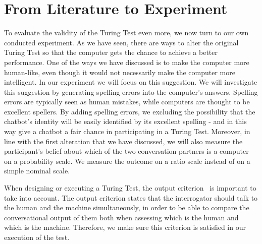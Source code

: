 \section{From Literature to Experiment}
To evaluate the validity of the Turing Test even more, we now turn to our own conducted experiment. As we have seen, there are ways to alter the original Turing Test so that the computer gets the chance to achieve a better performance. One of the ways we have discussed is to make the computer more human-like, even though it would not necessarily make the computer more intelligent. In our experiment we will focus on this suggestion. We will investigate this suggestion by generating spelling errors into the computer’s answers. Spelling errors are typically seen as human mistakes, while computers are thought to be excellent spellers. By adding spelling errors, we excluding the possibility that the chatbot’s identity will be easily identified by its excellent spelling - and in this way give a chatbot a fair chance in participating in a Turing Test. Moreover, in line with the first alteration that we have discussed, we will also measure the participant’s belief about which of the two conversation partners is a computer on a probability scale. We measure the outcome on a ratio scale instead of on a simple nominal scale.

When designing or executing a Turing Test, the output criterion~\cite{copeland2015artificial} is important to take into account. The output criterion states that the interrogator should talk to the human and the machine simultaneously, in order to be able to compare the conversational output of them both when assessing which is the human and which is the machine. Therefore, we make sure this criterion is satisfied in our execution of the test.

